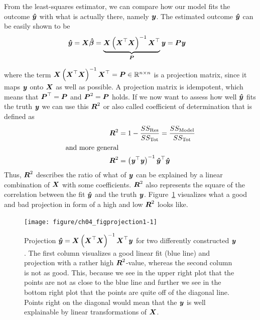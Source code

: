 \documentclass[11pt,a4paper,twoside]{book}\usepackage[]{graphicx}\usepackage[]{xcolor}
\newenvironment{knitrout}{}{} %
\begin{document}
From the least-squares estimator, we can compare how our model fits the outcome ${\boldsymbol{\hat{y}}}$ with what is actually there, namely ${\textbf{\textit{y}}}$. The estimated outcome ${\boldsymbol{\hat{y}}}$ can be easily shown to be
\begin{align*}
{\boldsymbol{\hat{y}}}&={\boldsymbol{X}}{\boldsymbol{\hat\beta}}
=\underbrace{{\boldsymbol{X}}\left({\boldsymbol{X}}^\top{\boldsymbol{X}}\right)^{-1}{\boldsymbol{X}}^\top}_{{\boldsymbol{P}}}{\textbf{\textit{y}}}={\boldsymbol{P}}{\textbf{\textit{y}}}
\end{align*}

where the term ${\boldsymbol{X}}\left({\boldsymbol{X}}^\top{\boldsymbol{X}}\right)^{-1}{\boldsymbol{X}}^\top={\boldsymbol{P}}\in{\mathbb{R}}^{n\times n}$ is a projection matrix, since it maps ${\textbf{\textit{y}}}$ onto ${\boldsymbol{X}}$ as well as possible. A projection matrix is idempotent, which means that ${\boldsymbol{P}}^\top={\boldsymbol{P}}$ and ${\boldsymbol{P}}^2={\boldsymbol{P}}$ holds. If we now want to assess how well ${\boldsymbol{\hat{y}}}$ fits the truth ${\textbf{\textit{y}}}$ we can use this ${\boldsymbol{R}}^2$ or also called coefficient of determination that is defined as
\begin{align}
{\boldsymbol{R}}^2&=1-\frac{SS_\text{Res}}{SS_\text{Tot}}=\frac{SS_\text{Model}}{SS_\text{Tot}}\nonumber\\
\text{and more general}&\nonumber\\
{\boldsymbol{R}}^2&=\left({\textbf{\textit{y}}}^\top {\textbf{\textit{y}}}\right)^{-1}{\boldsymbol{\hat{y}}}^\top {\boldsymbol{\hat{y}}}\label{eq:r2}
\end{align}
Thus, ${\boldsymbol{R}}^2$ describes the ratio of what of ${\textbf{\textit{y}}}$ can be explained by a linear combination of ${\boldsymbol{X}}$ with some coefficients. ${\boldsymbol{R}}^2$ also represents the square of the correlation between the fit ${\boldsymbol{\hat{y}}}$ and the truth ${\textbf{\textit{y}}}$. Figure~\ref{fig:projection1} visualizes what a good and bad projection in form of a high and low ${\boldsymbol{R}}^2$ looks like.

\begin{figure}[H]%
\begin{center}
\begin{knitrout}
\color{fgcolor}
\texttt{[image: figure/ch04\_figprojection1-1]} 
\end{knitrout}
\end{center}
\vspace{-1cm}
\caption{Projection ${\boldsymbol{\hat{y}}}={\boldsymbol{X}}\left({\boldsymbol{X}}^\top{\boldsymbol{X}}\right)^{-1}{\boldsymbol{X}}^\top{\textbf{\textit{y}}}$ for two differently constructed ${\textbf{\textit{y}}}$. The first column visualizes a good linear fit (blue line) and projection with a rather high ${\boldsymbol{R}}^2$-value, whereas the second column is not as good. This, because we see in the upper right plot that the points are not as close to the blue line and further we see in the bottom right plot that the points are quite off of the diagonal line. Points right on the diagonal would mean that the ${\textbf{\textit{y}}}$ is well explainable by linear transformations of ${\boldsymbol{X}}$.}
\label{fig:projection1}
\end{figure}
\end{document}
